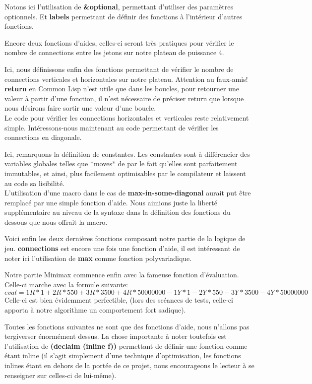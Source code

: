 \documentclass[a4paper, 12pt]{article}
\newcommand{\connect}[1]{
  
}
\numberwithin{equation}{subsection}
\begin{document}
\connect{55-67}
Notons ici l'utilisation de {\bf \&optional}, permettant d'utiliser des paramètres optionnels. Et {\bf labels} permettant de définir des fonctions à l'intérieur d'autres fonctions.

\connect{70-90}
Encore deux fonctions d'aides, celles-ci seront très pratiques pour vérifier le nombre de connections entre les jetons sur notre plateau de puissance 4.

\connect{92-114}
Ici, nous définissons enfin des fonctions permettant de vérifier le nombre de connections verticales et horizontales sur notre plateau. Attention au faux-amis! {\bf return} en Common Lisp n'est utile que dans les boucles, pour retourner une valeur à partir d'une fonction, il n'est nécessaire de préciser return que lorsque nous désirons faire sortir une valeur d'une boucle.\\

Le code pour vérifier les connections horizontales et verticales reste relativement simple. Intéressons-nous maintenant au code permettant de vérifier les connections en diagonale.

\connect{117-174}
Ici, remarquons la définition de constantes. Les constantes sont à différencier des variables globales telles que *moves* de par le fait qu'elles sont parfaitement immutables, et ainsi, plus facilement optimisables par le compilateur et laissent au code sa lisibilité. \\

L'utilisation d'une macro dans le cas de {\bf max-in-some-diagonal} aurait put être remplacé par une simple fonction d'aide. Nous aimions juste la liberté supplémentaire au niveau de la syntaxe dans la définition des fonctions du dessous que nous offrait la macro.

\connect{176-188}
Voici enfin les deux dernières fonctions composant notre partie de la logique de jeu. {\bf connections} est encore une fois une fonction d'aide, il est intéressant de noter ici l'utilisation de {\bf max} comme fonction polyvariadique.

\connect{190-205}
Notre partie Minimax commence enfin avec la fameuse fonction d'évaluation. Celle-ci marche avec la formule suivante:
$$eval = 1R * 1 + 2R * 550 + 3R * 3500 + 4R * 50000000 - 1Y * 1 - 2Y * 550 -3Y * 3500 - 4Y * 50000000$$
Celle-ci est bien évidemment perfectible, (lors des scéances de tests, celle-ci apporta à notre algorithme un comportement fort sadique).

\connect{207-257}
Toutes les fonctions suivantes ne sont que des fonctions d'aide, nous n'allons pas tergiverser énormément dessus. La chose importante à noter toutefois est l'utilisation de {\bf (declaim (inline f))} permettant de définir une fonction comme étant inline (il s'agit simplement d'une technique d'optimisation, les fonctions inlines étant en dehors de la portée de ce projet, nous encourageons le lecteur à se renseigner sur celles-ci de lui-même).
\end{document}
